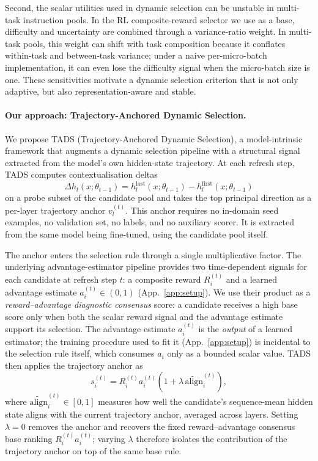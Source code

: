 Second, the scalar utilities used in dynamic selection can be
unstable in multi-task instruction pools. In the RL composite-reward
selector we use as a base, difficulty and uncertainty are combined
through a variance-ratio weight. In multi-task pools, this weight can
shift with task composition because it conflates within-task and
between-task variance; under a naive per-micro-batch implementation,
it can even lose the difficulty signal when the micro-batch size is
one. These sensitivities motivate a dynamic selection criterion that
is not only adaptive, but also representation-aware and stable.

\paragraph{Our approach: Trajectory-Anchored Dynamic Selection.}
We propose \textsc{TADS} (Trajectory-Anchored Dynamic Selection), a
model-intrinsic framework that augments a dynamic selection pipeline
with a structural signal extracted from the model's own hidden-state
trajectory. At each refresh step, \textsc{TADS} computes
contextualisation deltas
\[
\Delta h_l(x;\theta_{t-1})
=
h_l^{\mathrm{last}}(x;\theta_{t-1})
-
h_l^{\mathrm{first}}(x;\theta_{t-1})
\]
on a probe subset of the candidate pool and takes the top principal
direction as a per-layer trajectory anchor $v_l^{(t)}$. This anchor
requires no in-domain seed examples, no validation set, no labels,
and no auxiliary scorer. It is extracted from the same model being
fine-tuned, using the candidate pool itself.

The anchor enters the selection rule through a single multiplicative
factor. The underlying advantage-estimator pipeline provides two
time-dependent signals for each candidate at refresh step $t$: a
composite reward $R_i^{(t)}$ and a learned advantage estimate
$a_i^{(t)} \in (0,1)$ (App.~\ref{app:setup}). We use their product
as a \emph{reward--advantage diagnostic consensus} score: a
candidate receives a high base score only when both the scalar
reward signal and the advantage estimate support its selection.
The advantage estimate $a_i^{(t)}$ is the \emph{output} of a learned
estimator; the training procedure used to fit it
(App.~\ref{app:setup}) is incidental to the selection rule
itself, which consumes $a_i$ only as a bounded scalar value.
\textsc{TADS} then applies the trajectory anchor as
\[
s_i^{(t)}
=
R_i^{(t)} a_i^{(t)}
\left(
1+\lambda\,\widetilde{\mathrm{align}}_i^{(t)}
\right),
\]
where $\widetilde{\mathrm{align}}_i^{(t)}\in[0,1]$ measures how well
the candidate's sequence-mean hidden state aligns with the current
trajectory anchor, averaged across layers. Setting $\lambda=0$
removes the anchor and recovers the fixed reward--advantage consensus
base ranking $R_i^{(t)}a_i^{(t)}$; varying $\lambda$ therefore
isolates the contribution of the trajectory anchor on top of the
same base rule.

